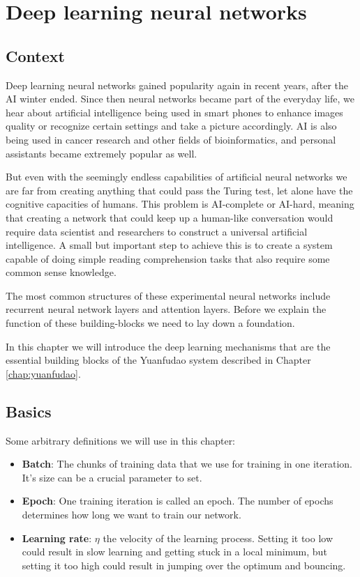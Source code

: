 \chapter{Deep learning neural networks}
\label{chap:deep}
\section{Context}
Deep learning neural networks gained popularity again in recent years, after the AI winter ended. Since then neural networks became part of the everyday life, we hear about artificial intelligence being used in smart phones to enhance images quality or recognize certain settings and take a picture accordingly. AI is also being used in cancer research and other fields of bioinformatics, and personal assistants became extremely popular as well.

But even with the seemingly endless capabilities of artificial neural networks we are far from creating anything that could pass the Turing test, let alone have the cognitive capacities of humans. This problem is AI-complete or AI-hard, meaning that creating a network that could keep up a human-like conversation would require data scientist and researchers to construct a universal artificial intelligence. A small but important step to achieve this is to create a system capable of doing simple reading comprehension tasks that also require some common sense knowledge.

The most common structures of these experimental neural networks include recurrent neural network layers and attention layers. Before we explain the function of these building-blocks we need to lay down a foundation.

In this chapter we will introduce the deep learning mechanisms that are the essential building blocks of the Yuanfudao system described in Chapter \ref{chap:yuanfudao}.

\section{Basics}
\begin{minipage}{\textwidth}
Some arbitrary definitions we will use in this chapter:
\begin{itemize}
	\item \textbf{Batch}: The chunks of training data that we use for training in one iteration. It's size can be a crucial parameter to set.
	\item \textbf{Epoch}: One training iteration is called an epoch. The number of epochs determines how long we want to train our network.
	\item \textbf{Learning rate}: \(\eta\) the velocity of the learning process. Setting it too low could result in slow learning and getting stuck in a local minimum, but setting it too high could result in jumping over the optimum and bouncing.
\end{itemize}
\end{minipage}

